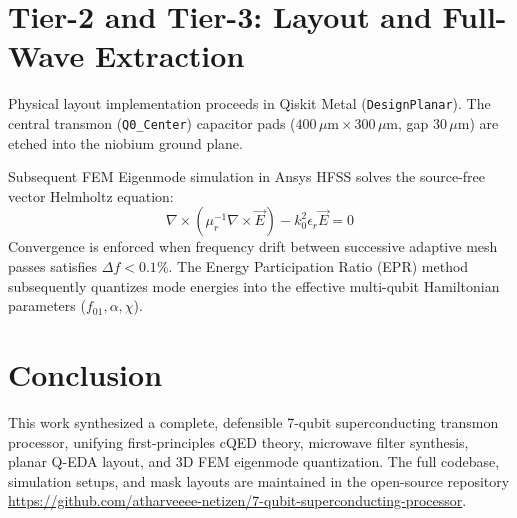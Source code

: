 \documentclass[10pt,journal,compsoc]{IEEEtran}
\begin{document}
\section{Tier-2 and Tier-3: Layout and Full-Wave Extraction}
Physical layout implementation proceeds in Qiskit Metal (\texttt{DesignPlanar}). The central transmon (\texttt{Q0\_Center}) capacitor pads ($400\,\mu\text{m} \times 300\,\mu\text{m}$, gap $30\,\mu\text{m}$) are etched into the niobium ground plane. 

Subsequent FEM Eigenmode simulation in Ansys HFSS solves the source-free vector Helmholtz equation:
\begin{equation}
\nabla \times \left(\mu_r^{-1} \nabla \times \vec{E}\right) - k_0^2 \epsilon_r \vec{E} = 0
\end{equation}
Convergence is enforced when frequency drift between successive adaptive mesh passes satisfies $\Delta f < 0.1\%$. The Energy Participation Ratio (EPR) method subsequently quantizes mode energies into the effective multi-qubit Hamiltonian parameters ($f_{01}, \alpha, \chi$).

\section{Conclusion}
This work synthesized a complete, defensible 7-qubit superconducting transmon processor, unifying first-principles cQED theory, microwave filter synthesis, planar Q-EDA layout, and 3D FEM eigenmode quantization. The full codebase, simulation setups, and mask layouts are maintained in the open-source repository \url{https://github.com/atharveeee-netizen/7-qubit-superconducting-processor}.

\end{document}
